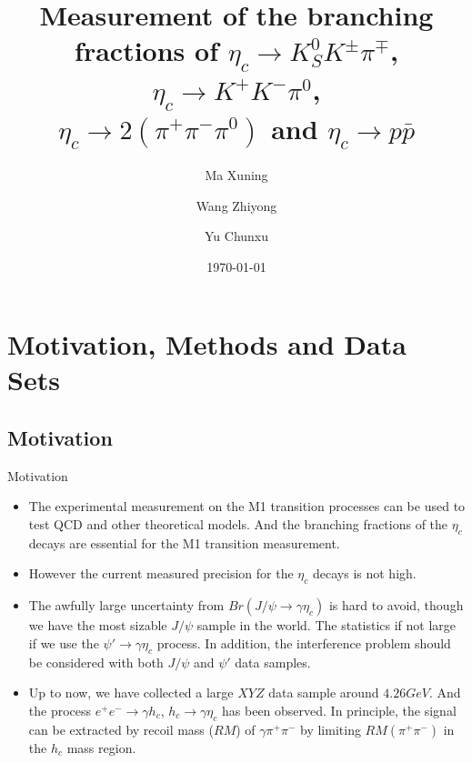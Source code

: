 \documentclass{beamer}
\title[Measurement of Branching fractions]{Measurement of the branching fractions of $\eta_c\to K^0_S K^{\pm}\pi^{\mp}$, $\eta_c\to K^+K^-\pi^0$,\\ $\eta_c\to 2(\pi^+\pi^-\pi^0)$ and $\eta_c \to p \bar{p}$}
\author{Ma Xuning \inst{1} \and Wang Zhiyong\inst{2} \and Yu Chunxu \inst{1}}
\institute[]{\inst{1} Nankai Univ. \and \inst{2} IHEP}
\date{\today}
\begin{document}
\begin{frame}
  \titlepage 
\end{frame}


\section{Motivation, Methods and Data Sets}
\subsection{Motivation}
\begin{frame}{Motivation}
  \begin{block}{}
    \begin{itemize}
        \item The experimental measurement on the M1 transition processes can be used to test QCD and other theoretical models. And the branching fractions of the $\eta_c$ decays are essential for the M1 transition measurement.
        \item However the current measured precision for the $\eta_c$ decays is not high.
    \end{itemize}
  \end{block}
  \begin{block}{}
    \begin{itemize}
        \item The awfully large uncertainty from $Br(J/\psi\to\gamma\eta_c)$ is hard to avoid, though we have the most sizable $J/\psi$ sample in the world. The statistics if not large if we use the $\psi\prime\to\gamma\eta_c$ process. In addition, the interference problem should be considered with both $J/\psi$ and $\psi\prime$ data samples.
        \item Up to now, we have collected a large $XYZ$ data sample around $4.26 GeV$. And the process $e^+e^-\to\gamma h_c$, $h_c\to\gamma\eta_c$ has been observed. In principle, the signal can be extracted by recoil mass ($RM$) of $\gamma\pi^+\pi^-$ by limiting $RM(\pi^+\pi^-)$ in the $h_c$ mass region.
    \end{itemize}
  \end{block}
\end{frame}
\end{document}
